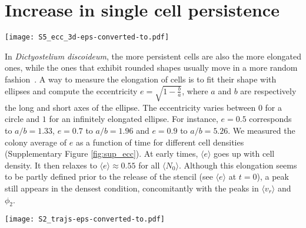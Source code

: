 \documentclass[11pt, twocolumn]{article}
\begin{document}
\clearpage
\section{Increase in single cell persistence}

\begin{figure*}[h!]
\centering
\texttt{[image: S5\_ecc\_3d-eps-converted-to.pdf]}

\caption{Cells tend to be more elongated at high density.\\
  Time evolution of the average eccentricity of the cell shapes'
  obtained by fitting ellipses for different initial densities
  $\langle N_0\rangle$. The error bars are the standard deviations of the $e$ distributions.}
\label{fig:sup_ecc}
\end{figure*}

In \textit{Dictyostelium discoideum}, the more persistent cells are
also the more elongated ones, while the ones that exhibit rounded
shapes usually move in a more random
fashion~\cite{Gole2011,Heid2004}. A way to measure the elongation of
cells is to fit their shape with ellipses and compute the eccentricity
$e=\sqrt{1-\frac{b}{a}}$, where $a$ and $b$ are respectively the long
and short axes of the ellipse. The eccentricity varies between $0$ for
a circle and $1$ for an infinitely elongated ellipse. For instance,
$e=0.5$ corresponds to $a/b=1.33$, $e=0.7$ to $a/b=1.96$ and $e=0.9$
to $a/b=5.26$. We measured the colony average of $e$ as a function of
time for different cell densities (Supplementary Figure
\ref{fig:sup_ecc}). At early times, $\langle e\rangle$ goes up with
cell density. It then relaxes to $\langle e\rangle\approx 0.55$ for
all $\langle N_0\rangle$.  Although this elongation seems to be partly
defined prior to the release of the stencil (see $\langle e\rangle$ at
$t=0$), a peak still appears in the densest condition, concomitantly
with the peaks in $\langle v_r\rangle$ and $\phi_2$.


\begin{figure*}[h]
\centering
\texttt{[image: S2\_trajs-eps-converted-to.pdf]}

\caption{Increase in single cell persistence.\\
  Example of single cell trajectories from the lowest
  ($\langle N_0\rangle = 35$) or highest ($\langle N_0\rangle = 246$)
  cell density experiments, at times $t=0-30\,\minute$,
  $t=100-130\,\minute$, $t=200-230\,\minute$,
  $t=300-330\,\minute$. The persistence is seen to increase
  transiently around $t=100\,\minute$ in the high density case, while
  at low density it does not change markedly in time. Grid spacing:
  $200\,\micro$m.}
\label{fig:sup_trajs}
\end{figure*}
\end{document}
